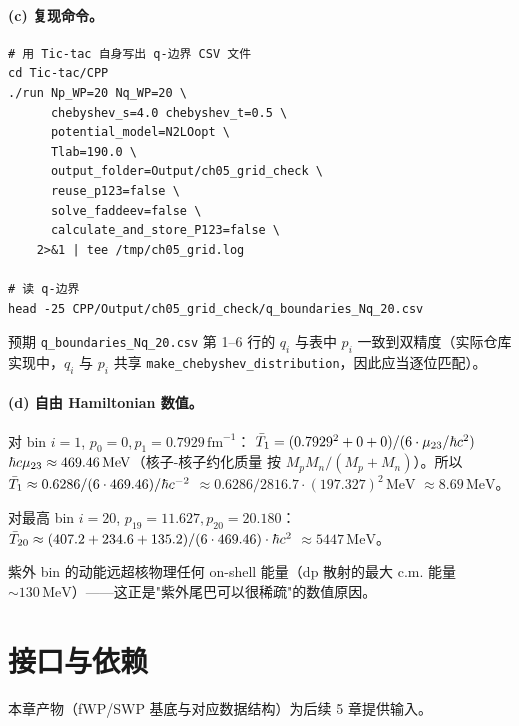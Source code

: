 \begin{numericalbox}[label={box:ch05-numerical-closure}]
\paragraph{(c) 复现命令。}
\begin{lstlisting}[style=config]
# 用 Tic-tac 自身写出 q-边界 CSV 文件
cd Tic-tac/CPP
./run Np_WP=20 Nq_WP=20 \
      chebyshev_s=4.0 chebyshev_t=0.5 \
      potential_model=N2LOopt \
      Tlab=190.0 \
      output_folder=Output/ch05_grid_check \
      reuse_p123=false \
      solve_faddeev=false \
      calculate_and_store_P123=false \
    2>&1 | tee /tmp/ch05_grid.log

# 读 q-边界
head -25 CPP/Output/ch05_grid_check/q_boundaries_Nq_20.csv
\end{lstlisting}
预期 \texttt{q\_boundaries\_Nq\_20.csv} 第 1--6 行的 \(q_i\) 与表中
\(p_i\) 一致到双精度（实际仓库实现中，\(q_i\) 与 \(p_i\) 共享
\texttt{make\_chebyshev\_distribution}，因此应当逐位匹配）。

\paragraph{(d) 自由 Hamiltonian 数值。}
对 bin \(i = 1\), \(p_0 = 0, p_1 = 0.7929\,\mathrm{fm}^{-1}\)：
\(\bar{T}_1 = (0.7929^2 + 0 + 0)/(6 \cdot \mu_{23}/\hbar c^2)\)
\(\hbar c \mu_{23} \approx 469.46\,\mathrm{MeV}\)（核子-核子约化质量
按 \(M_p M_n / (M_p + M_n)\)）。所以 \(\bar{T}_1 \approx
0.6286 / (6 \cdot 469.46) / \hbar c^{-2}\)
\(\approx 0.6286 / 2816.7 \cdot (197.327)^2\,\mathrm{MeV}\)
\(\approx 8.69\,\mathrm{MeV}\)。

对最高 bin \(i = 20\), \(p_{19} = 11.627, p_{20} = 20.180\)：
\(\bar{T}_{20} \approx (407.2 + 234.6 + 135.2)/(6 \cdot 469.46) \cdot
\hbar c^2\)
\(\approx 5447\,\mathrm{MeV}\)。

紫外 bin 的动能远超核物理任何 on-shell 能量（dp 散射的最大 c.m. 能量
\(\sim 130\,\mathrm{MeV}\)）——这正是"紫外尾巴可以很稀疏"的数值原因。

\end{numericalbox}

\section{接口与依赖}
\label{sec:ch05-interface}

本章产物（fWP/SWP 基底与对应数据结构）为后续 5 章提供输入。

